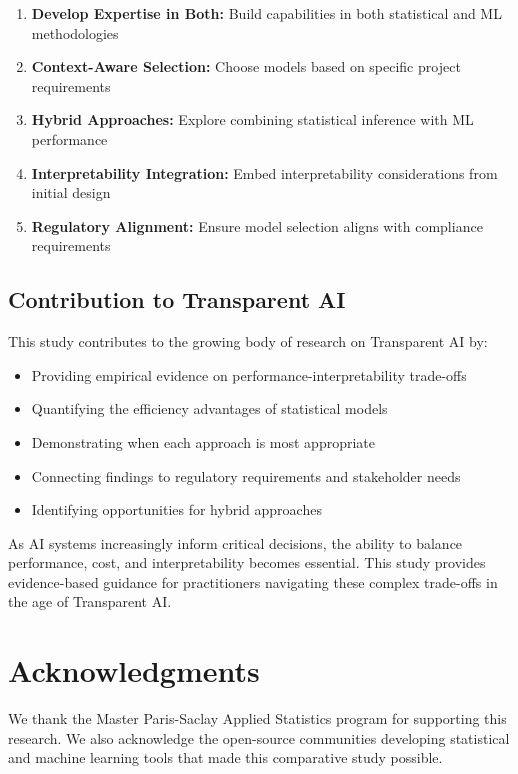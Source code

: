 \documentclass[11pt,a4paper]{article}
\begin{document}
\begin{enumerate}
    \item \textbf{Develop Expertise in Both:} Build capabilities in both statistical and ML methodologies
    \item \textbf{Context-Aware Selection:} Choose models based on specific project requirements
    \item \textbf{Hybrid Approaches:} Explore combining statistical inference with ML performance
    \item \textbf{Interpretability Integration:} Embed interpretability considerations from initial design
    \item \textbf{Regulatory Alignment:} Ensure model selection aligns with compliance requirements
\end{enumerate}

\subsection{Contribution to Transparent AI}

This study contributes to the growing body of research on Transparent AI by:

\begin{itemize}
    \item Providing empirical evidence on performance-interpretability trade-offs
    \item Quantifying the efficiency advantages of statistical models
    \item Demonstrating when each approach is most appropriate
    \item Connecting findings to regulatory requirements and stakeholder needs
    \item Identifying opportunities for hybrid approaches
\end{itemize}

As AI systems increasingly inform critical decisions, the ability to balance performance, cost, and interpretability becomes essential. This study provides evidence-based guidance for practitioners navigating these complex trade-offs in the age of Transparent AI.

\section{Acknowledgments}

We thank the Master Paris-Saclay Applied Statistics program for supporting this research. We also acknowledge the open-source communities developing statistical and machine learning tools that made this comparative study possible.
\end{document}

